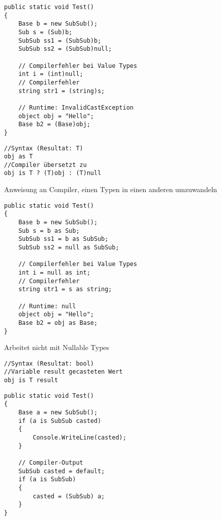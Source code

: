 \begin{multicols*}{2}
\begin{lstlisting}
public static void Test()
{
    Base b = new SubSub();
    Sub s = (Sub)b;
    SubSub ss1 = (SubSub)b;
    SubSub ss2 = (SubSub)null;
    
    // Compilerfehler bei Value Types 
    int i = (int)null;
    // Compilerfehler
    string str1 = (string)s;
    
    // Runtime: InvalidCastException
    object obj = "Hello";
    Base b2 = (Base)obj;
}
\end{lstlisting}
\begin{lstlisting}
//Syntax (Resultat: T)
obj as T
//Compiler übersetzt zu
obj is T ? (T)obj : (T)null
\end{lstlisting}
Anweisung an Compiler, einen Typen in einen anderen umzuwandeln
\begin{lstlisting}
public static void Test()
{
    Base b = new SubSub();
    Sub s = b as Sub;
    SubSub ss1 = b as SubSub;
    SubSub ss2 = null as SubSub;
    
    // Compilerfehler bei Value Types 
    int i = null as int;
    // Compilerfehler
    string str1 = s as string;
    
    // Runtime: null
    object obj = "Hello";
    Base b2 = obj as Base;
}
\end{lstlisting}
Arbeitet nicht mit Nullable Types
\begin{lstlisting}
//Syntax (Resultat: bool)
//Variable result gecasteten Wert
obj is T result
\end{lstlisting}
\begin{lstlisting}
public static void Test()
{
    Base a = new SubSub();
    if (a is SubSub casted)
    {
        Console.WriteLine(casted);
    }
    
    // Compiler-Output
    SubSub casted = default;    
    if (a is SubSub)
    {
        casted = (SubSub) a;
    }
}
\end{lstlisting}

\end{multicols*}
